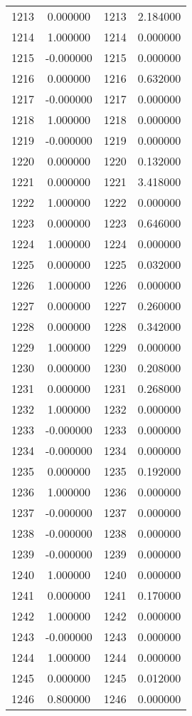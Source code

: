 \documentclass[12pt]{article}
\begin{document}
\begin{longtable}{@{}cccc@{}}
1213 & 0.000000 & 1213 & 2.184000 \\
1214 & 1.000000 & 1214 & 0.000000 \\
1215 & -0.000000 & 1215 & 0.000000 \\
1216 & 0.000000 & 1216 & 0.632000 \\
1217 & -0.000000 & 1217 & 0.000000 \\
1218 & 1.000000 & 1218 & 0.000000 \\
1219 & -0.000000 & 1219 & 0.000000 \\
1220 & 0.000000 & 1220 & 0.132000 \\
1221 & 0.000000 & 1221 & 3.418000 \\
1222 & 1.000000 & 1222 & 0.000000 \\
1223 & 0.000000 & 1223 & 0.646000 \\
1224 & 1.000000 & 1224 & 0.000000 \\
1225 & 0.000000 & 1225 & 0.032000 \\
1226 & 1.000000 & 1226 & 0.000000 \\
1227 & 0.000000 & 1227 & 0.260000 \\
1228 & 0.000000 & 1228 & 0.342000 \\
1229 & 1.000000 & 1229 & 0.000000 \\
1230 & 0.000000 & 1230 & 0.208000 \\
1231 & 0.000000 & 1231 & 0.268000 \\
1232 & 1.000000 & 1232 & 0.000000 \\
1233 & -0.000000 & 1233 & 0.000000 \\
1234 & -0.000000 & 1234 & 0.000000 \\
1235 & 0.000000 & 1235 & 0.192000 \\
1236 & 1.000000 & 1236 & 0.000000 \\
1237 & -0.000000 & 1237 & 0.000000 \\
1238 & -0.000000 & 1238 & 0.000000 \\
1239 & -0.000000 & 1239 & 0.000000 \\
1240 & 1.000000 & 1240 & 0.000000 \\
1241 & 0.000000 & 1241 & 0.170000 \\
1242 & 1.000000 & 1242 & 0.000000 \\
1243 & -0.000000 & 1243 & 0.000000 \\
1244 & 1.000000 & 1244 & 0.000000 \\
1245 & 0.000000 & 1245 & 0.012000 \\
1246 & 0.800000 & 1246 & 0.000000 \\

\end{longtable}
\end{document}

